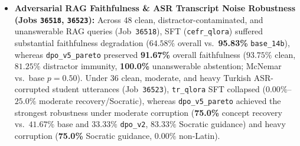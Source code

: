 \documentclass[a4paper,12pt]{report}
\begin{document}
\begin{itemize}
    \item \textbf{Adversarial RAG Faithfulness \& ASR Transcript Noise Robustness (Jobs \texttt{36518}, \texttt{36523}):} Across $48$ clean, distractor-contaminated, and unanswerable RAG queries (Job~\texttt{36518}), SFT (\texttt{cefr\_qlora}) suffered substantial faithfulness degradation ($64.58\%$ overall vs.\ \textbf{95.83\%} \texttt{base\_14b}), whereas \texttt{dpo\_v5\_pareto} preserved \textbf{91.67\%} overall faithfulness ($93.75\%$ clean, $81.25\%$ distractor immunity, \textbf{100.0\%} unanswerable abstention; McNemar vs.\ base $p=0.50$). Under $36$ clean, moderate, and heavy Turkish ASR-corrupted student utterances (Job~\texttt{36523}), \texttt{tr\_qlora} SFT collapsed ($0.00\%$--$25.0\%$ moderate recovery/Socratic), whereas \texttt{dpo\_v5\_pareto} achieved the strongest robustness under moderate corruption (\textbf{75.0\%} concept recovery vs.\ $41.67\%$ base and $33.33\%$ \texttt{dpo\_v2}, $83.33\%$ Socratic guidance) and heavy corruption (\textbf{75.0\%} Socratic guidance, $0.00\%$ non-Latin).
\end{itemize}
\end{document}
